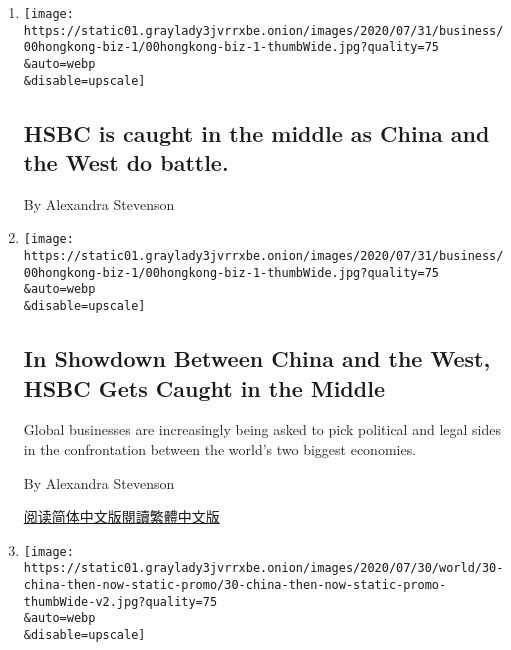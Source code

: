 \begin{enumerate}
\def\labelenumi{\arabic{enumi}.}
\item
  \href{/live/2020/08/03/business/stock-market-today-coronavirus/hsbc-is-caught-in-the-middle-as-china-and-the-west-do-battle}{}

  \texttt{[image: https://static01.graylady3jvrrxbe.onion/images/2020/07/31/business/00hongkong-biz-1/00hongkong-biz-1-thumbWide.jpg?quality=75\\\&auto=webp\\\&disable=upscale]}

  \hypertarget{hsbc-is-caught-in-the-middle-as-china-and-the-west-do-battle}{%
  \subsection{HSBC is caught in the middle as China and the West do
  battle.}\label{hsbc-is-caught-in-the-middle-as-china-and-the-west-do-battle}}

  By Alexandra Stevenson
\item
  \href{/2020/08/03/business/hsbc-china-hong-kong-united-states.html}{}

  \texttt{[image: https://static01.graylady3jvrrxbe.onion/images/2020/07/31/business/00hongkong-biz-1/00hongkong-biz-1-thumbWide.jpg?quality=75\\\&auto=webp\\\&disable=upscale]}

  \hypertarget{in-showdown-between-china-and-the-west-hsbc-gets-caught-in-the-middle}{%
  \subsection{In Showdown Between China and the West, HSBC Gets Caught
  in the
  Middle}\label{in-showdown-between-china-and-the-west-hsbc-gets-caught-in-the-middle}}

  Global businesses are increasingly being asked to pick political and
  legal sides in the confrontation between the world's two biggest
  economies.

  By Alexandra Stevenson

  \href{https://cn.nytimes3xbfgragh.onion/business/20200804/hsbc-china-hong-kong-united-states/}{阅读简体中文版}\href{https://cn.nytimes3xbfgragh.onion/business/20200804/hsbc-china-hong-kong-united-states/zh-hant/}{閱讀繁體中文版}
\item
  \href{/interactive/2020/07/30/world/asia/china-1950s-echoed-today.html}{}

  \texttt{[image: https://static01.graylady3jvrrxbe.onion/images/2020/07/30/world/30-china-then-now-static-promo/30-china-then-now-static-promo-thumbWide-v2.jpg?quality=75\\\&auto=webp\\\&disable=upscale]}


\end{enumerate}
